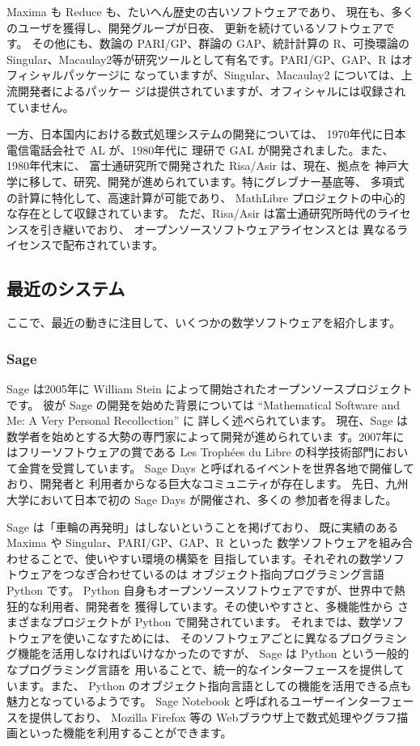 \documentclass[mingoth,a4paper]{jsarticle}
\begin{document}
Maxima も Reduce も、たいへん歴史の古いソフトウェアであり、
現在も、多くのユーザを獲得し、開発グループが日夜、
更新を続けているソフトウェアです。
その他にも、数論の PARI/GP、群論の GAP、統計計算の R、可換環論の Singular、Macaulay2等が研究ツールとして有名です。PARI/GP、GAP、R はオフィシャルパッケージに
なっていますが、Singular、Macaulay2 については、上流開発者によるパッケー
ジは提供されていますが、オフィシャルには収録されていません。

一方、日本国内における数式処理システムの開発については、
1970年代に日本電信電話会社で AL が、1980年代に
理研で GAL が開発されました。また、1980年代末に、
富士通研究所で開発された Risa/Asir は、現在、拠点を
神戸大学に移して、研究、開発が進められています。特にグレブナー基底等、
多項式の計算に特化して、高速計算が可能であり、
MathLibre プロジェクトの中心的な存在として収録されています。
ただ、Risa/Asir は富士通研究所時代のライセンスを引き継いでおり、
オープンソースソフトウェアライセンスとは
異なるライセンスで配布されています。

\subsection{最近のシステム}
ここで、最近の動きに注目して、いくつかの数学ソフトウェアを紹介します。
\subsubsection{Sage}
Sage は2005年に William Stein によって開始されたオープンソースプロジェクトです。
彼が Sage の開発を始めた背景については
``Mathematical Software and Me: A Very Personal Recollection'' \cite{stein}に
詳しく述べられています。
現在、Sage は数学者を始めとする大勢の専門家によって開発が進められていま
す。2007年にはフリーソフトウェアの賞である
Les Troph\'{e}es du Libre の科学技術部門において金賞を受賞しています。
Sage Days と呼ばれるイベントを世界各地で開催しており、開発者と
利用者からなる巨大なコミュニティが存在します。
先日、九州大学において日本で初の Sage Days が開催され、多くの
参加者を得ました。

Sage は「車輪の再発明」はしないということを掲げており、
既に実績のある Maxima や Singular、PARI/GP、GAP、R といった
数学ソフトウェアを組み合わせることで、使いやすい環境の構築を
目指しています。それぞれの数学ソフトウェアをつなぎ合わせているのは
オブジェクト指向プログラミング言語 Python です。
Python 自身もオープンソースソフトウェアですが、世界中で熱狂的な利用者、開発者を
獲得しています。その使いやすさと、多機能性から
さまざまなプロジェクトが Python で開発されています。
それまでは、数学ソフトウェアを使いこなすためには、
そのソフトウェアごとに異なるプログラミング機能を活用しなければいけなかったのですが、
Sage は Python という一般的なプログラミング言語を
用いることで、統一的なインターフェースを提供しています。また、
Python のオブジェクト指向言語としての機能を活用できる点も
魅力となっているようです。
Sage Notebook と呼ばれるユーザーインターフェースを提供しており、
Mozilla Firefox 等の
Webブラウザ上で数式処理やグラフ描画といった機能を利用することができます。
\end{document}
